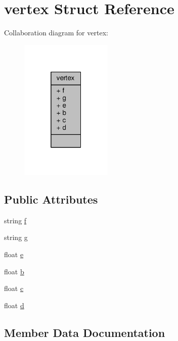 \hypertarget{structvertex}{}\section{vertex Struct Reference}
\label{structvertex}


Collaboration diagram for vertex\+:
\nopagebreak
\begin{figure}[H]
\begin{center}
\leavevmode
\includegraphics[width=124pt]{structvertex__coll__graph}
\end{center}
\end{figure}
\subsection*{Public Attributes}
\begin{DoxyCompactItemize}
\item 
string \hyperlink{structvertex_a5d46b53771d1b9d8b5cfb6029885e459}{f}
\item 
string \hyperlink{structvertex_a39517d9a99f88564f9df7b769bb6bc03}{g}
\item 
float \hyperlink{structvertex_af8d8ef1d3668f17dd630f21b08e655af}{e}
\item 
float \hyperlink{structvertex_a6df5b4f72e5950da15cdbaca18ac1230}{b}
\item 
float \hyperlink{structvertex_aa81f2ac6178fa638e21e0ffdbe55eeed}{c}
\item 
float \hyperlink{structvertex_a141c5cd092c8ba46392e5f068422f985}{d}
\end{DoxyCompactItemize}


\subsection{Member Data Documentation}

